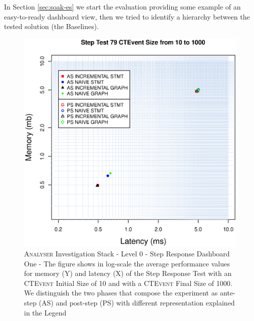 In Section \ref{sec:soak-es} we start the evaluation providing some example of an easy-to-ready dashboard view, then we tried to identify a hierarchy between the tested solution (the Baselines). 

\begin{figure}[htbp]
	\centering
	\includegraphics[width=\linewidth]{images/level-0-step-dashboard-1}	
	\caption[\textsc{Analyser} Investigation Stack - Level 0 - Step Response Dashboard One]{\textsc{Analyser} Investigation Stack - Level 0 - Step Response Dashboard One - The figure shows in log-scale the average performance values for memory (Y) and latency (X) of the Step Response Test with an \textsc{CTEvent} Initial Size of 10 and with a \textsc{CTEvent} Final Size of 1000. We distinguish the two phases that compose the experiment as ante-step (AS) and post-step (PS) with different representation explained in the Legend}
	\label{fig:level-0-step-dashboard-1}
\end{figure}
